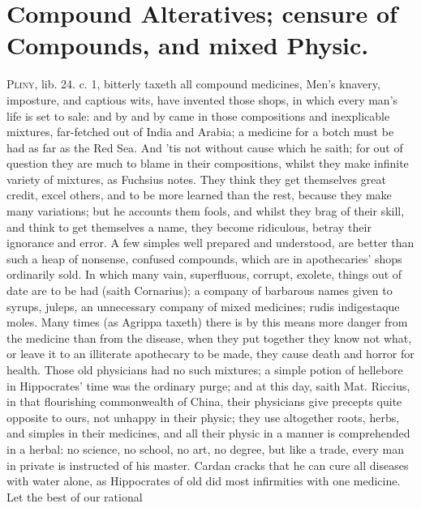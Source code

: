 {%
\section[Compound Alteratives]{Compound Alteratives; censure of Compounds, and mixed
Physic.}

\lettrine{P}{liny}, lib. 24. c. 1, bitterly taxeth all compound medicines, 
Men's knavery, imposture, and captious wits, have invented those shops,
in which every man's life is set to sale: and by and by came in those
compositions and inexplicable mixtures, far-fetched out of India and
Arabia; a medicine for a botch must be had as far as the Red Sea. And
'tis not without cause which he saith; for out of question they are
much to blame in their compositions, whilst they make infinite
variety of mixtures, as Fuchsius notes. They think they get
themselves great credit, excel others, and to be more learned than the
rest, because they make many variations; but he accounts them fools,
and whilst they brag of their skill, and think to get themselves a
name, they become ridiculous, betray their ignorance and error. A few
simples well prepared and understood, are better than such a heap of
nonsense, confused compounds, which are in apothecaries' shops
ordinarily sold. In which many vain, superfluous, corrupt, exolete,
things out of date are to be had (saith Cornarius); a company of
barbarous names given to syrups, juleps, an unnecessary company of
mixed medicines; rudis indigestaque moles. Many times (as Agrippa
taxeth) there is by this means more danger from the medicine than
from the disease, when they put together they know not what, or leave
it to an illiterate apothecary to be made, they cause death and horror
for health. Those old physicians had no such mixtures; a simple potion
of hellebore in Hippocrates' time was the ordinary purge; and at this
day, saith Mat. Riccius, in that flourishing commonwealth of
China, their physicians give precepts quite opposite to ours, not
unhappy in their physic; they use altogether roots, herbs, and simples
in their medicines, and all their physic in a manner is comprehended in
a herbal: no science, no school, no art, no degree, but like a trade,
every man in private is instructed of his master. Cardan cracks
that he can cure all diseases with water alone, as Hippocrates of old
did most infirmities with one medicine. Let the best of our rational
}
